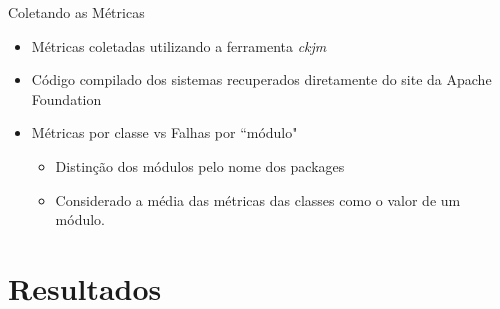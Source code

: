 \documentclass[t,14pt,mathserif]{beamer}
\begin{document}
\begin{frame}{Coletando as Métricas}

	\begin{itemize}
		\item Métricas coletadas utilizando a ferramenta \textit{ckjm}\cite{Jur10}
		\item Código compilado dos sistemas recuperados diretamente do site da Apache Foundation
		\item Métricas por classe vs Falhas por ``módulo"
		\begin{itemize}
			\item Distinção dos módulos pelo nome dos packages
			\item Considerado a média das métricas das classes como o valor de um módulo.
		\end{itemize}
	\end{itemize}


\end{frame}
\section{Resultados}
\end{document}

